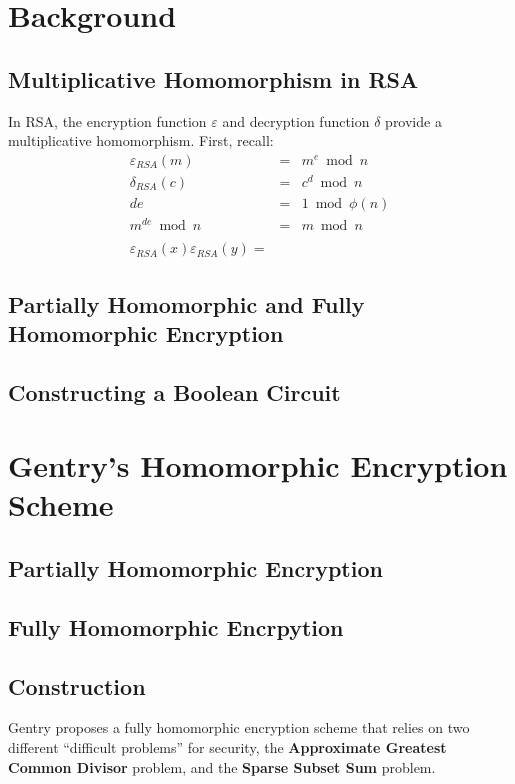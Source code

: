 \documentclass[a4paper,10pt]{article}
\begin{document}
\section{Background}

\subsection{Multiplicative Homomorphism in RSA}
In RSA, the encryption function $\varepsilon$ and decryption function $\delta$ provide a multiplicative homomorphism. First, recall:
\begin{eqnarray}
\varepsilon_{RSA}(m) &=& m^e \bmod n\\
\delta_{RSA}(c) &=& c^d \bmod n\\
de &=& 1 \bmod \phi(n)\\
m^{de} \bmod n &=& m \bmod n\\
\\
\varepsilon_{RSA}(x) \varepsilon_{RSA}(y) = 
\end{eqnarray}


\subsection{Partially Homomorphic and Fully Homomorphic Encryption}

\subsection{Constructing a Boolean Circuit}


\section{Gentry's Homomorphic Encryption Scheme}

\subsection{Partially Homomorphic Encryption}

\subsection{Fully Homomorphic Encrpytion}

\subsection{Construction}
Gentry proposes a fully homomorphic encryption scheme that relies on
two different ``difficult problems'' for security, the
\textbf{Approximate Greatest Common Divisor} problem, and the
\textbf{Sparse Subset Sum} problem.
\end{document}
